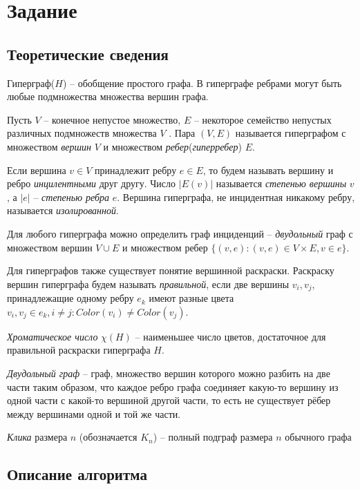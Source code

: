 \documentclass[a4paper, 12pt]{article}
\newcommand{\RNum}[1]{\uppercase\expandafter{\romannumeral #1\relax}}
\begin{document}
\section{Задание \RNum{8}}
\subsection{Теоретические сведения}
Гиперграф($H$) -- обобщение простого графа. В гиперграфе ребрами могут быть любые подмножества множества вершин графа. 

Пусть $V$ – конечное непустое множество, $E$ – некоторое семейство непустых различных
подмножеств множества $V$ . Пара $(V, E)$ называется гиперграфом с множеством \emph{вершин} $V$
и множеством \emph{ребер}(\emph{гиперребер}) $E$.

Если вершина $ v \in V$ принадлежит ребру $e \in E$, то будем называть вершину и ребро \emph{инцилентными} друг другу.
Число $|E(v)|$ называется \emph{степенью вершины} $v$, а $|e|$ -- \emph{степенью ребра} $e$. Вершина гиперграфа, не 
инцидентная никакому ребру, называется \emph{изолированной}.

Для любого гиперграфа можно определить граф инциденций -- \emph{двудольный} граф с множеством вершин 
$ V \cup E $ и множеством ребер $ \{(v, e): (v, e) \in V \times E, v\in e\} $.

Для гиперграфов также существует понятие вершинной раскраски. Раскраску вершин гиперграфа будем называть \emph{правильной}, 
если две вершины $v_i, v_j $, принадлежащие одному ребру $ e_k $ имеют разные цвета $v_i, v_j \in e_k, i \neq j : Color(v_i) \neq Color(v_j)$.

\emph{Хроматическое число} $ \chi(H) $ -- наименьшее число цветов, достаточное для правильной раскраски гиперграфа $H$.

\emph{Двудольный граф} -- граф, множество вершин которого можно разбить на две части таким образом, 
что каждое ребро графа соединяет какую-то вершину из одной части с какой-то вершиной другой части, то есть не существует рёбер между вершинами одной и той же части.

\emph{Клика} размера $n$ (обозначается $K_n$) -- полный подграф размера $n$ обычного графа 

\subsection{Описание алгоритма}
\end{document}
